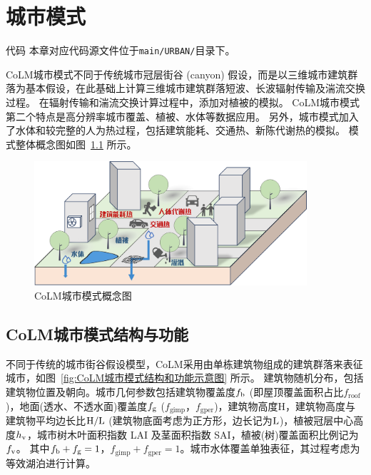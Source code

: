 \chapter{城市模式}\label{城市模式}
\begin{mymdframed}{代码}
  本章对应代码源文件位于\texttt{main/URBAN/}目录下。
\end{mymdframed}

CoLM城市模式不同于传统城市冠层街谷 (canyon) 假设，而是以三维城市建筑群落为基本假设，在此基础上计算三维城市建筑群落短波、长波辐射传输及湍流交换过程。
在辐射传输和湍流交换计算过程中，添加对植被的模拟。
CoLM城市模式第二个特点是高分辨率城市覆盖、植被、水体等数据应用。
另外，城市模式加入了水体和较完整的人为热过程，包括建筑能耗、交通热、新陈代谢热的模拟。
模式整体概念图如图~\ref{fig:CoLM城市模式概念图} 所示。
\newline
{
  \begin{figure}[htbp]
    \centering
    \includegraphics[width=0.9\textwidth]{Figures/城市模式/CoLM城市模式概念图.png}
    \caption{CoLM城市模式概念图}
    \label{fig:CoLM城市模式概念图}
  \end{figure}
}

\section{CoLM城市模式结构与功能}
不同于传统的城市街谷假设模型，CoLM采用由单栋建筑物组成的建筑群落来表征城市，如图~\ref{fig:CoLM城市模式结构和功能示意图} 所示。
建筑物随机分布，包括建筑物位置及朝向。城市几何参数包括建筑物覆盖度$f_{\rm b}$ (即屋顶覆盖面积占比$f_{\mathrm{roof}}$)，地面(透水、不透水面)覆盖度$f_{\rm g}$ ($f_{\mathrm{gimp}}$，$f_{\mathrm{gper}}$)，建筑物高度${\mathrm {H}}$，建筑物高度与建筑物平均边长比$\rm H/L$ (建筑物底面考虑为正方形，边长记为$\rm L$)，植被冠层中心高度$h_{\rm v}$，城市树木叶面积指数 LAI 及茎面积指数 SAI，植被(树)覆盖面积比例记为$f_{\rm v}$。
其中$f_{\rm b}+f_{\rm g}=1$，$f_{\mathrm{gimp}}+f_{\mathrm{gper}}=1$。城市水体覆盖单独表征，其过程考虑为等效湖泊进行计算。

